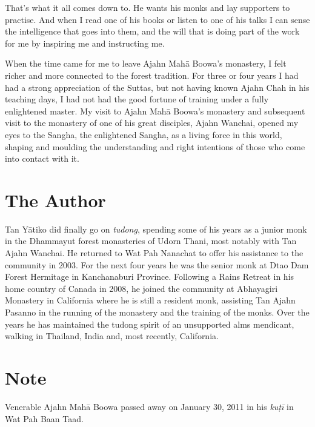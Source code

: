 That's what it all comes down to. He wants his monks and lay supporters
to practise. And when I read one of his books or listen to one of his
talks I can sense the intelligence that goes into them, and the will
that is doing part of the work for me by inspiring me and instructing
me. 

When the time came for me to leave Ajahn Mahā Boowa's monastery, I felt
richer and more connected to the forest tradition. For three or four
years I had had a strong appreciation of the Suttas, but not having
known Ajahn Chah in his teaching days, I had not had the good fortune of
training under a fully enlightened master. My visit to Ajahn Mahā
Boowa's monastery and subsequent visit to the monastery of one of his
great disciples, Ajahn Wanchai, opened my eyes to the Sangha, the
enlightened Sangha, as a living force in this world, shaping and
moulding the understanding and right intentions of those who come into
contact with it. 

\clearpage

\section{The Author}

Tan Yātiko did finally go on \emph{tudong}, spending some of his years as
a junior monk in the Dhammayut forest
monasteries of Udorn Thani, most notably with Tan Ajahn Wanchai. He
returned to Wat Pah Nanachat to offer his assistance to the community in
2003. For the next four years he was the senior monk at Dtao Dam Forest
Hermitage in Kanchanaburi Province. Following a Rains Retreat in his
home country of Canada in 2008, he joined the community at Abhayagiri
Monastery in California where he is still a resident monk, assisting Tan
Ajahn Pasanno in the running of the monastery and the training of the
monks. Over the years he has maintained the tudong spirit of an
unsupported alms mendicant, walking in Thailand, India and, most
recently, California.

\section{Note}

Venerable Ajahn Mahā Boowa passed away on January 30, 2011 in his
\emph{kuṭī} in Wat Pah Baan Taad.

